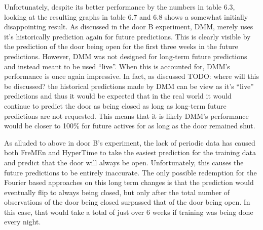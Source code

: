 Unfortunately, despite its better performance by the numbers in table 6.3,
looking at the resulting graphs in table 6.7 and 6.8 shows a somewhat
initially disappointing result. As discussed in the door B experiment,
DMM, merely uses it's historically prediction again for future
predictions. This is clearly visible by the prediction of the door being open
for the first three weeks in the future predictions.  However, DMM was not
designed for long-term future predictions and instead meant to be used
``live''. When this is accounted for, DMM's performance is once again
impressive.  In fact, as discussed TODO: where will this be discussed? the
historical predictions made by DMM can be view as it's ``live''
predictions and thus it would be expected that in the real world it would
continue to predict the door as being closed as long as long-term future
predictions are not requested. This means that it is likely DMM's
performance would be closer to 100\% for future actives for as long as the door
remained shut. \\

\begin{table}[h!]
  \centering

  \caption{Door C Data Overview}
\end{table}

As alluded to above in door B's experiment, the lack of periodic data has
caused both FreMEn and HyperTime to take the easiest prediction for the
training data and predict that the door will always be open. Unfortunately,
this causes the future predictions to be entirely inaccurate. The only possible redemption
for the Fourier based approaches on this long term changes is that the
prediction would eventually flip to always being closed, but only after the total number of observations of the door being
closed surpassed that of the door being open. In this case, that would take a
total of just over 6 weeks if training was being done every night. \\

